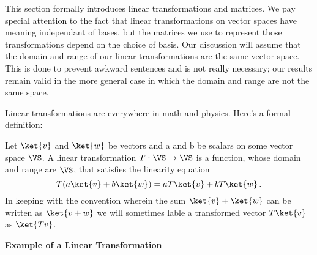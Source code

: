 
This section formally introduces linear transformations and matrices.
We pay special attention to the fact that linear transformations on vector spaces have meaning independant of bases, but the matrices we use to represent those transformations depend on the choice of basis.
Our discussion will assume that the domain and range of our linear transformations are the same vector space.
This is done to prevent awkward sentences and is not really necessary; our results remain valid in the more general case in which the domain and range are not the same space.

Linear transformations are everywhere in math and physics.
Here's a formal definition:

\begin{definition}
  Let $\ket{v}$ and $\ket{w}$ be vectors and a and b be scalars on some vector space $\VS$.
  A linear transformation $T:\VS \rightarrow \VS$ is a function, whose domain and range are $\VS$, that satisfies the linearity equation
  \begin{displaymath}
    T(a\ket{v} + b\ket{w}) = aT\ket{v} + bT\ket{w} \,.
  \end{displaymath}
  In keeping with the convention wherein the sum $\ket{v} + \ket{w}$ can be written as $\ket{v+w}$ we will sometimes lable a transformed vector $T\ket{v}$ as $\ket{Tv}$.
\end{definition}

\begin{flushleft}\textbf{Example of a Linear Transformation}\end{flushleft}

